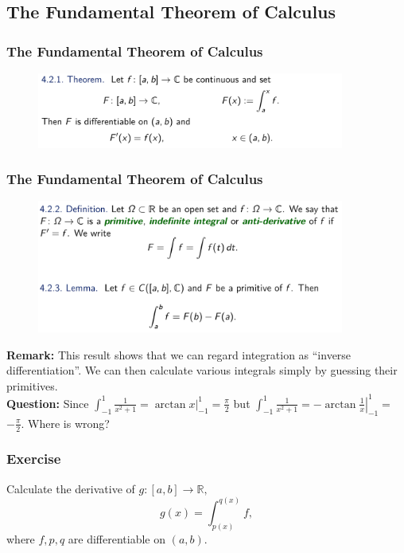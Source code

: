\documentclass[10pt, t]{beamer}
\newcommand{\R}{\mathbb{R}}
\begin{document}
\subsection{The Fundamental Theorem of Calculus}
\begin{frame}
    \frametitle{The Fundamental Theorem of Calculus}
    \begin{figure}[H]
        \centering
        \includegraphics[width=0.9\textwidth]{2020-12-02-13-38-29.png}
    \end{figure}
\end{frame}

\begin{frame}
    \frametitle{The Fundamental Theorem of Calculus}

    \begin{figure}[H]
        \centering
        \includegraphics[width=0.9\textwidth]{2020-12-02-13-39-39.png}
    \end{figure}

    \textbf{Remark:} This result shows that we can regard integration as ``inverse differentiation''. We can then calculate various integrals simply by guessing their primitives.\\
    \textbf{Question:} Since $\int_{-1}^{1} \frac{1}{x^{2}+1}=\left.\arctan x\right|_{-1} ^{1}=\frac{\pi}{2}$ but $\int_{-1}^{1} \frac{1}{x^{2}+1}=-\left.\arctan \frac{1}{x}\right|_{-1} ^{1}=$
    $-\frac{\pi}{2}$. Where is wrong?
\end{frame}

\begin{frame}
    \frametitle{Exercise}

    Calculate the derivative of $g:[a,b]\to\R,$ $$g(x)=\int_{p(x)}^{q(x)}f,$$ where $f,p,q$ are differentiable on $(a,b)$.

\end{frame}
\end{document}
